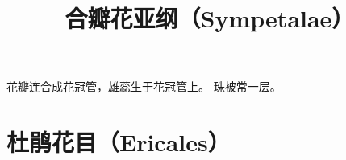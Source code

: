 \documentclass[11pt]{article}
\title{合瓣花亚纲（Sympetalae）}
\author{}
\date{}
\begin{document}
\begin{sloppypar}
  \maketitle

  \linenumbers
花瓣连合成花冠管，雄蕊生于花冠管上。
珠被常一层。

\section{杜鹃花目（Ericales）}
  
\end{sloppypar}
\end{document}
